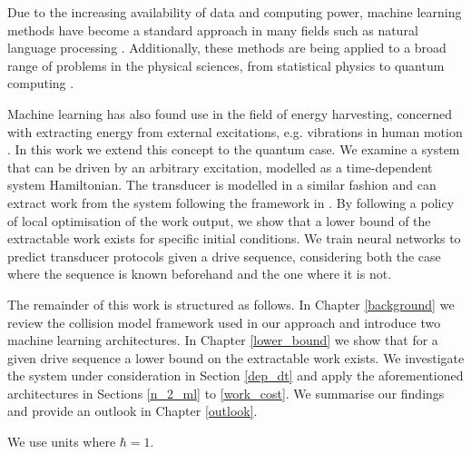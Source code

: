 Due to the increasing availability of data and computing power, machine learning methods have become a standard approach in many fields such as natural language processing \cite{DBLP:journals/corr/VaswaniSPUJGKP17}.
Additionally, these methods are being applied to a broad range of problems in the physical sciences, from statistical physics to quantum computing \cite{Carleo_2019, wise2021using}.

Machine learning has also found use in the field of energy harvesting, concerned with extracting energy from external excitations, e.g. vibrations in human motion \cite{Liu2019}.
In this work we extend this concept to the quantum case.
We examine a system that can be driven by an arbitrary excitation, modelled as a time-dependent system Hamiltonian.
The transducer is modelled in a similar fashion and can extract work from the system following the framework in \cite{beyer2020}.
By following a policy of local optimisation of the work output, we show that a lower bound of the extractable work exists for specific initial conditions.
We train neural networks to predict transducer protocols given a drive sequence, considering both the case where the sequence is known beforehand and the one where it is not.

The remainder of this work is structured as follows.
In Chapter \ref{background} we review the collision model framework used in our approach and introduce two machine learning architectures.
In Chapter \ref{lower_bound} we show that for a given drive sequence a lower bound on the extractable work exists.
We investigate the system under consideration in Section \ref{dep_dt} and apply the aforementioned architectures in Sections \ref{n_2_ml} to \ref{work_cost}.
We summarise our findings and provide an outlook in Chapter \ref{outlook}.

We use units where $\hbar = 1$.